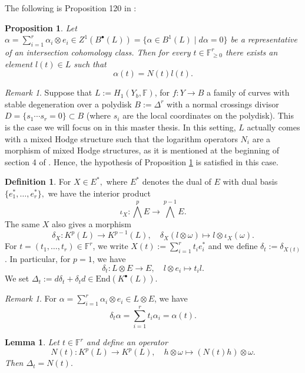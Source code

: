 \documentclass[a4paper,12 pt,titlepage,twoside]{book}
\newcommand{\numberset}{\mathbb}
\newcommand{\F}{\numberset{F}}
\theoremstyle{plain}
\theoremstyle{theorem}
\newtheorem{lemma}[thm]{Lemma}
\newtheorem{prop}[thm]{Proposition}
\theoremstyle{definition}
\newtheorem{defn}[thm]{Definition}
\theoremstyle{remark}
\newtheorem{oss}[thm]{Remark}
\begin{document}
	The following is Proposition 120 in \cite{MR3983292}:
	\begin{prop}\label{N(t)l(t)}
		Let $\alpha= \sum_{i=1}^r \alpha_i \otimes e_i \in Z^1(B^\bullet(L)) = \{\alpha \in B^1(L) \mid d\alpha =0\}$ be a representative of an intersection cohomology class. Then for every $t \in \F^r_{\ge 0}$ there exists an element $l(t) \in L$ such that $$\alpha(t) = N(t)l(t).$$
	\end{prop}
	\begin{oss}\label{rmk: mhs}
		Suppose that $L := H_1(Y_b, \F)$, for $f \colon Y \rightarrow B$ a family of curves with stable degeneration over a polydisk $B:= \Delta^r$ with a normal crossings divisor $D =\{s_1 \cdots s_r=0\} \subset B$ (where $s_i$ are the local coordinates on the polydisk). This is the case we will focus on in this master thesis. In this setting, $L$ actually comes with a mixed Hodge structure such that the logarithm operators $N_i$ are a morphism of mixed Hodge structures, as it is mentioned at the beginning of section 4 of \cite{MR2059020}. Hence, the hypothesis of Proposition \ref{N(t)l(t)} is satisfied in this case.
	\end{oss}
	\begin{defn}
		For $X \in E^*,$ where $E^*$ denotes the dual of $E$ with dual basis $\{e_1^*, \dots, e_r^*\},$ we have the interior product $$\iota_X \colon \bigwedge^p E \rightarrow \bigwedge^{p-1} E.$$ The same $X$ also gives a morphism $$\delta_X \colon K^p(L) \rightarrow K^{p-1}(L), \quad \delta_X(l \otimes \omega) \mapsto l \otimes \iota_X(\omega).$$
		For $t=(t_1,\dots, t_r) \in \F^r$, we write $X(t) := \sum_{i=1}^r t_i e_i^*$ and we define $\delta_t := \delta_{X(t)}$. In particular, for $p=1$, we have $$\delta_t \colon L \otimes E \rightarrow E, \quad l\otimes e_i \mapsto t_i l.$$
		We set $\Delta_t := d \delta_t + \delta_t d \in \text{End}(K^\bullet(L)).$
	\end{defn}
	\begin{oss}
		For $\alpha = \sum_{i=1}^r \alpha_i \otimes e_i \in L \otimes E$, we have $$\delta_t \alpha = \sum_{i=1}^r t_i \alpha_i = \alpha(t).$$
	\end{oss}
	\begin{lemma}
		Let $t \in \F^r$ and define an operator $$N(t) \colon K^p(L) \rightarrow K^p(L), \quad h \otimes \omega \mapsto (N(t)h)\otimes \omega.$$ Then $\Delta_t = N(t).$
	\end{lemma}
\end{document}
